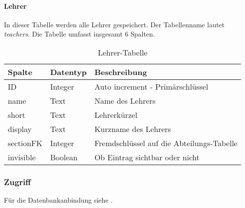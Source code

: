 \paragraph{Lehrer\\}
In dieser Tabelle werden alle Lehrer gespeichert. Der Tabellenname lautet \textit{teachers}. Die Tabelle umfasst insgesamt 6 Spalten.

\begin{table}[H]
\centering
\begin{tabular}{p{2.5 cm}p{2.5 cm}p{10 cm}}
   \toprule
   \textbf{Spalte} & \textbf{Datentyp} & \textbf{Beschreibung} \\
   \midrule
          ID & Integer & Auto increment - Primärschlüssel  \\
          \hline
          name & Text & Name des Lehrers \\
          \hline
	      short & Text & Lehrerkürzel   \\
	      \hline
          display & Text & Kurzname des Lehrers   \\
          \hline
          sectionFK & Integer & Fremdschlüssel auf die Abteilungs-Tabelle   \\
          \hline
          invisible & Boolean & Ob Eintrag sichtbar oder nicht \\
   \bottomrule
\end{tabular}
\caption{Lehrer-Tabelle}
\end{table}

\subsubsection{Zugriff}
% 
Für die Datenbankanbindung siehe .\\

%
%

%
%
%
% 
%
